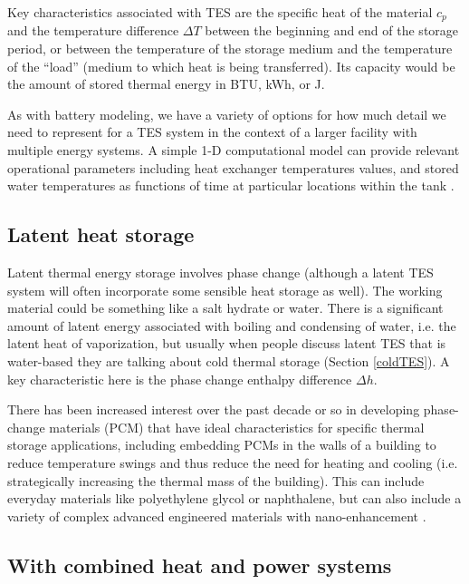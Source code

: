 \documentclass[10pt]{article}
\begin{document}
Key characteristics associated with TES are the specific heat of the material $c_p$ and the temperature difference $\Delta T$ between the beginning and end of the storage period, or between the temperature of the storage medium and the temperature of the ``load'' (medium to which heat is being transferred). Its capacity would be the amount of stored thermal energy in BTU, kWh, or J. 

As with battery modeling, we have a variety of options for how much detail we need to represent for a TES system in the context of a larger facility with multiple energy systems. A simple 1-D computational model can provide relevant operational parameters including heat exchanger temperatures values, and stored water temperatures as functions of time at particular locations within the tank \cite{Aowabin2}.


\subsection{Latent heat storage}

Latent thermal energy storage involves phase change (although a latent TES system will often incorporate some sensible heat storage as well). The working material could be something like a salt hydrate or water. There is a significant amount of latent energy associated with boiling and condensing of water, i.e. the latent heat of vaporization, but usually when people discuss latent TES that is water-based they are talking about cold thermal storage (Section \ref{coldTES}). A key characteristic here is the phase change enthalpy difference $\Delta h$.

There has been increased interest over the past decade or so in developing phase-change materials (PCM) that have ideal characteristics for specific thermal storage applications, including embedding PCMs in the walls of a building to reduce temperature swings and thus reduce the need for heating and cooling (i.e. strategically increasing the thermal mass of the building). This can include everyday materials like polyethylene glycol or naphthalene, but can also include a variety of complex advanced engineered materials with nano-enhancement \cite{Shah2018-hl}.

\subsection{With combined heat and power systems}
\end{document}
